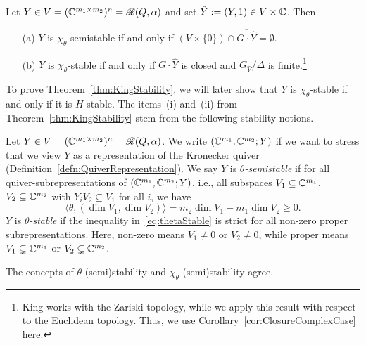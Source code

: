 \begin{lemma} \label{lem:KingLemma-2-2}
	Let $Y \in V = (\mathbb C^{m_1 \times m_2})^n = \mathscr{R} (Q, \alpha)$ and set $\hat{Y} := (Y,1) \in V \times \mathbb C$. Then
	\begin{itemize}
		\item[(a)] $Y$ is $\chi_\theta$-semistable if and only if $(V \times \{0\}) \cap \overline{G \cdot \hat{Y}} = \emptyset$.
		
		\item[(b)] $Y$ is $\chi_{\theta}$-stable if and only if $G \cdot \hat{Y}$ is closed and $G_{\hat{Y}} / \Delta$ is finite.\footnote{King works with the Zariski topology, while we apply this result with respect to the Euclidean topology. Thus, we use Corollary~\ref{cor:ClosureComplexCase} here.}
	\end{itemize}
\end{lemma}

To prove Theorem~\ref{thm:KingStability}, we will later show that $Y$ is $\chi_\theta$-stable if and only if it is $H$-stable. The items~(i) and~(ii) from Theorem~\ref{thm:KingStability} stem from the following stability notions.

\begin{defn} \label{defn:KingThetaStability}
	Let $Y \in V = (\mathbb C^{m_1 \times m_2})^n = \mathscr{R}(Q,\alpha)$. We write $(\mathbb C^{m_1}, \mathbb C^{m_2}; Y)$ if we want to stress that we view $Y$ as a representation of the Kronecker quiver (Definition~\ref{defn:QuiverRepresentation}).
	We say $Y$ is \emph{$\theta$-semistable} if
	for all quiver-subrepresentations of $(\mathbb C^{m_1}, \mathbb C^{m_2}; Y)$, i.e., all subspaces $V_1 \subseteq \mathbb C^{m_1}$, $V_2 \subseteq \mathbb C^  {m_2}$ with $Y_i V_2 \subseteq V_1$ for all $i$, we have
	\begin{equation}\label{eq:thetaStable}
		\langle \theta, (\dim V_1, \dim V_2) \rangle = m_2 \dim V_1 - m_1 \dim V_2 \geq 0.
	\end{equation}
	$Y$ is \emph{$\theta$-stable} if the inequality in~\eqref{eq:thetaStable} is strict for all non-zero proper subrepresentations. Here, non-zero means $V_1 \neq 0$ or $V_2 \neq 0$, while proper means $V_1 \subsetneq \mathbb C^{m_1}$ or $V_2 \subsetneq \mathbb C^{m_2}$. 
	\hfill{}
\end{defn}

The concepts of $\theta$-(semi)stability and $\chi_\theta$-(semi)stability agree.

